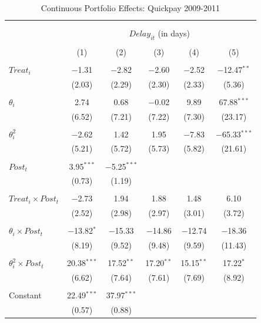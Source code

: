 \documentclass[]{article}
\begin{document}
\begin{table}[H] \centering 
  \caption{Continuous Portfolio Effects: Quickpay 2009-2011} 
  \label{} 
\small 
\begin{tabular}{@{\extracolsep{-2pt}}lccccc} 
\\[-1.8ex]\hline 
\hline \\[-1.8ex] 
\\[-1.8ex] & \multicolumn{5}{c}{$Delay_{it}$ (in days)} \\ 
\\[-1.8ex] & (1) & (2) & (3) & (4) & (5)\\ 
\hline \\[-1.8ex] 
 $Treat_i$ & $-$1.31 & $-$2.82 & $-$2.60 & $-$2.52 & $-$12.47$^{**}$ \\ 
  & (2.03) & (2.29) & (2.30) & (2.33) & (5.36) \\ 
  & & & & & \\ 
 $\theta_i$ & 2.74 & 0.68 & $-$0.02 & 9.89 & 67.88$^{***}$ \\ 
  & (6.52) & (7.21) & (7.22) & (7.30) & (23.17) \\ 
  & & & & & \\ 
 $\theta_i^2$ & $-$2.62 & 1.42 & 1.95 & $-$7.83 & $-$65.33$^{***}$ \\ 
  & (5.21) & (5.72) & (5.73) & (5.82) & (21.61) \\ 
  & & & & & \\ 
 $Post_t$ & 3.95$^{***}$ & $-$5.25$^{***}$ &  &  &  \\ 
  & (0.73) & (1.19) &  &  &  \\ 
  & & & & & \\ 
 $Treat_i \times Post_t$ & $-$2.73 & 1.94 & 1.88 & 1.48 & 6.10 \\ 
  & (2.52) & (2.98) & (2.97) & (3.01) & (3.72) \\ 
  & & & & & \\ 
 $\theta_i \times Post_t$ & $-$13.82$^{*}$ & $-$15.33 & $-$14.86 & $-$12.74 & $-$18.36 \\ 
  & (8.19) & (9.52) & (9.48) & (9.59) & (11.43) \\ 
  & & & & & \\ 
 $\theta_i^2 \times Post_t$ & 20.38$^{***}$ & 17.52$^{**}$ & 17.20$^{**}$ & 15.15$^{**}$ & 17.22$^{*}$ \\ 
  & (6.62) & (7.64) & (7.61) & (7.69) & (8.92) \\ 
  & & & & & \\ 
 Constant & 22.49$^{***}$ & 37.97$^{***}$ &  &  &  \\ 
  & (0.57) & (0.88) &  &  &  \\ 

\end{tabular}
\end{table}
\end{document}
